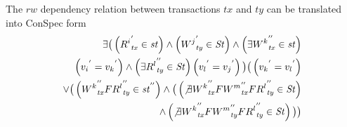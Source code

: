 \documentclass{sig-alternate-05-2015}
\begin{document}
 The $rw$ dependency relation between transactions $\mathit{tx}$ and $\mathit{ty}$ can be translated into ConSpec form
  \begin{align}\label{eqn:rw}
\begin{split}
\exists \big( %
\left( {R^i}^{'}_\mathit{tx} \in \mathit{st} \right)
   \wedge \left( {W^j}^{'}_\mathit{ty}  \in  \mathit{St} \right) \wedge
   \left( \exists  {W^k}^{''}_\mathit{tx} \in \mathit{st}  \right) \\
   \left( {v_i}^{'} = {v_k}^{'} \right)  \wedge 
  \left( \exists {R^l}^{''}_\mathit{ty} \in \mathit{St}  \right) \left( {v_l}^{'} = {v_j}^{'} \right)  \big)
  \big( \left( {v_k}^{'} = {v_l}^{'} \right) \\
   \vee  \big(  \left( {W^k}^{''}_\mathit{tx} F { R^l}^{''}_\mathit{ty} \in \mathit{st}^{''} \right)  \wedge
    \big( \left(  \not\exists {W^k}^{''}_\mathit{tx} F {W^m}^{''}_\mathit{tx} F { R^l}^{''}_\mathit{ty} \in \mathit{St} \right)  \\\wedge
   \left(  \not\exists {W^k}^{''}_\mathit{tx} F {W^m}^{''}_\mathit{ty} F { R^l}^{''}_\mathit{ty} \in \mathit{St} \right) \big) \big)
  \end{split}
  \end{align}

\end{document}
